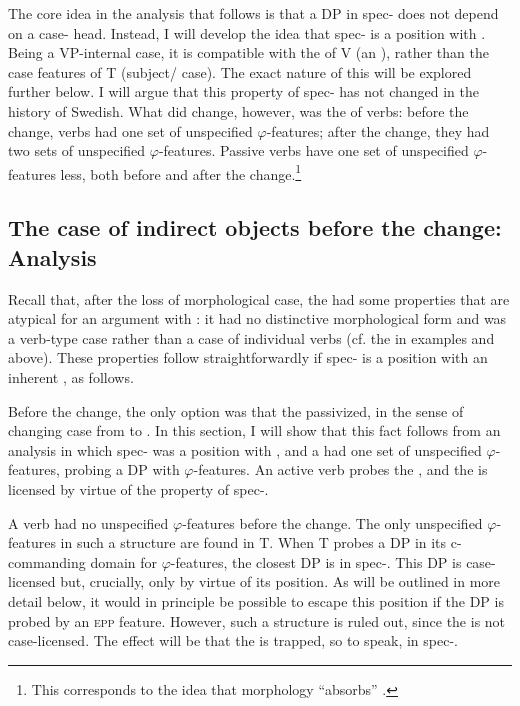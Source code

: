 \documentclass[output=paper]{langscibook}
\begin{document}
The core idea in the analysis that follows is that a DP in spec- does not depend on a case- head. Instead, I will develop the idea that spec- is a position with . Being a VP-internal case, it is compatible with the  of V (an ), rather than the case features of T (subject/ case). The exact nature of this  will be explored further below. I will argue that this property of spec- has not changed in the history of Swedish. What did change, however, was the  of  verbs: before the change,  verbs had one set of unspecified $\varphi ${}-features; after the change, they had two sets of unspecified $\varphi $-features. Passive verbs have one set of unspecified $\varphi ${}-features less, both before and after the change.\footnote{This corresponds to the idea that  morphology “absorbs” .}


\subsection{The case of indirect objects before the change: Analysis}\label{sec:falk:4.2}


Recall that, after the loss of morphological case, the  had some properties that are atypical for an argument with : it had no distinctive morphological form and was a verb-type case rather than a case of individual verbs (cf. the  in examples  and  above). These properties follow straightforwardly if spec- is a position with an inherent , as follows.


Before the change, the only option was that the  passivized, in the sense of changing case from  to . In this section, I will show that this fact follows from an analysis in which spec- was a position with , and a  had one set of unspecified $\varphi ${}-features, probing a DP with $\varphi $-features. An active verb probes the , and the  is licensed by virtue of the  property of spec-. 



A  verb had no unspecified $\varphi $-features before the change. The only unspecified $\varphi $-features in such a structure are found in T. When T probes a DP in its c-commanding domain for $\varphi $-features, the closest DP is in spec-. This DP is case-licensed but, crucially, only by virtue of its position. As will be outlined in more detail below, it would in principle be possible to escape this position if the  DP is probed by an \textsc{epp} feature. However, such a structure is ruled out, since the  is not case-licensed. The effect will be that the  is trapped, so to speak, in spec-. 
\end{document}

